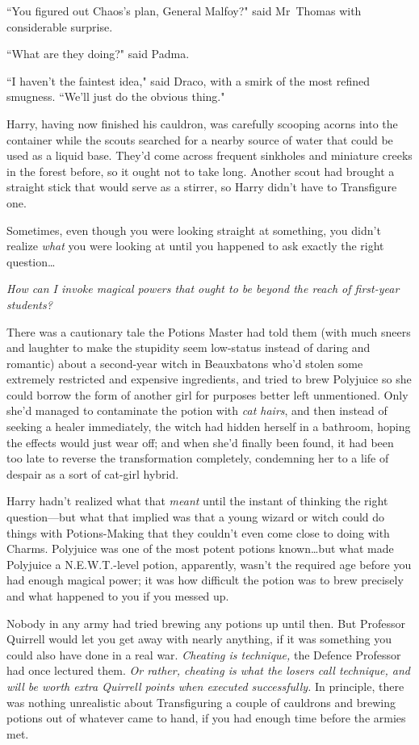 ``You figured out Chaos's plan, General Malfoy?" said Mr~Thomas with considerable surprise.

``What are they doing?" said Padma.

``I haven't the faintest idea," said Draco, with a smirk of the most refined smugness. ``We'll just do the obvious thing."

\later

Harry, having now finished his cauldron, was carefully scooping acorns into the container while the scouts searched for a nearby source of water that could be used as a liquid base. They'd come across frequent sinkholes and miniature creeks in the forest before, so it ought not to take long. Another scout had brought a straight stick that would serve as a stirrer, so Harry didn't have to Transfigure one.

Sometimes, even though you were looking straight at something, you didn't realize \emph{what} you were looking at until you happened to ask exactly the right question…

\emph{How can I invoke magical powers that ought to be beyond the reach of first-year students?}

There was a cautionary tale the Potions Master had told them (with much sneers and laughter to make the stupidity seem low-status instead of daring and romantic) about a second-year witch in Beauxbatons who'd stolen some extremely restricted and expensive ingredients, and tried to brew Polyjuice so she could borrow the form of another girl for purposes better left unmentioned. Only she'd managed to contaminate the potion with \emph{cat hairs}, and then instead of seeking a healer immediately, the witch had hidden herself in a bathroom, hoping the effects would just wear off; and when she'd finally been found, it had been too late to reverse the transformation completely, condemning her to a life of despair as a sort of cat-girl hybrid.

Harry hadn't realized what that \emph{meant} until the instant of thinking the right question—but what that implied was that a young wizard or witch could do things with Potions-Making that they couldn't even come close to doing with Charms. Polyjuice was one of the most potent potions known…but what made Polyjuice a N.E.W.T.-level potion, apparently, wasn't the required age before you had enough magical power; it was how difficult the potion was to brew precisely and what happened to you if you messed up.

Nobody in any army had tried brewing any potions up until then. But Professor Quirrell would let you get away with nearly anything, if it was something you could also have done in a real war. \emph{Cheating is technique,} the Defence Professor had once lectured them. \emph{Or rather, cheating is what the losers call technique, and will be worth extra Quirrell points when executed successfully.} In principle, there was nothing unrealistic about Transfiguring a couple of cauldrons and brewing potions out of whatever came to hand, if you had enough time before the armies met.

